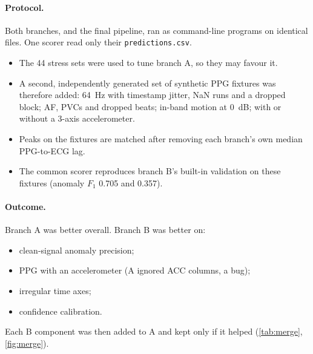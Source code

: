 \documentclass[10pt,a4paper]{article}
\newcommand{\code}[1]{\texttt{#1}}
\begin{document}
\paragraph{Protocol.}
Both branches, and the final pipeline, ran as command-line programs on identical files. One scorer read only
their \code{predictions.csv}.
\begin{itemize}
  \item The 44 stress sets were used to tune branch A, so they may favour it.
  \item A second, independently generated set of synthetic PPG fixtures was therefore added: \SI{64}{Hz} with timestamp jitter, NaN runs and a
        dropped block; AF, PVCs and dropped beats; in-band motion at \SI{0}{dB}; with or without a 3-axis accelerometer.
  \item Peaks on the fixtures are matched after removing each branch's own median PPG-to-ECG lag.
  \item The common scorer reproduces branch B's built-in validation on these fixtures (anomaly $F_1$ 0.705 and 0.357).
\end{itemize}

\paragraph{Outcome.}
Branch A was better overall. Branch B was better on:
\begin{itemize}
  \item clean-signal anomaly precision;
  \item PPG with an accelerometer (A ignored ACC columns, a bug);
  \item irregular time axes;
  \item confidence calibration.
\end{itemize}
Each B component was then added to A and kept only if it helped (\cref{tab:merge}, \cref{fig:merge}).
\end{document}
